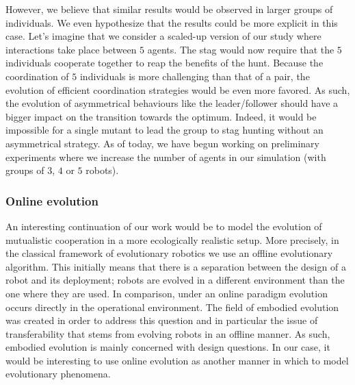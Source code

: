 			However, we believe that similar results would be observed in larger groups of individuals. We even hypothesize that the results could be more explicit in this case. Let's imagine that we consider a scaled-up version of our study where interactions take place between $5$ agents. The stag would now require that the $5$ individuals cooperate together to reap the benefits of the hunt. Because the coordination of $5$ individuals is more challenging than that of a pair, the evolution of efficient coordination strategies would be even more favored. As such, the evolution of asymmetrical behaviours like the leader/follower should have a bigger impact on the transition towards the optimum. Indeed, it would be impossible for a single mutant to lead the group to stag hunting without an asymmetrical strategy. As of today, we have begun working on preliminary experiments where we increase the number of agents in our simulation (with groups of $3$, $4$ or $5$ robots). 



		\subsubsection{Online evolution}

			An interesting continuation of our work would be to model the evolution of mutualistic cooperation in a more ecologically realistic setup. More precisely, in the classical framework of evolutionary robotics we use an offline evolutionary algorithm. This initially means that there is a separation between the design of a robot and its deployment; robots are evolved in a different environment than the one where they are used. In comparison, under an online paradigm evolution occurs directly in the operational environment. The field of embodied evolution~\parencite{Watson2002} was created in order to address this question and in particular the issue of transferability that stems from evolving robots in an offline manner. As such, embodied evolution is mainly concerned with design questions. In our case, it would be interesting to use online evolution as another manner in which to model evolutionary phenomena. 

